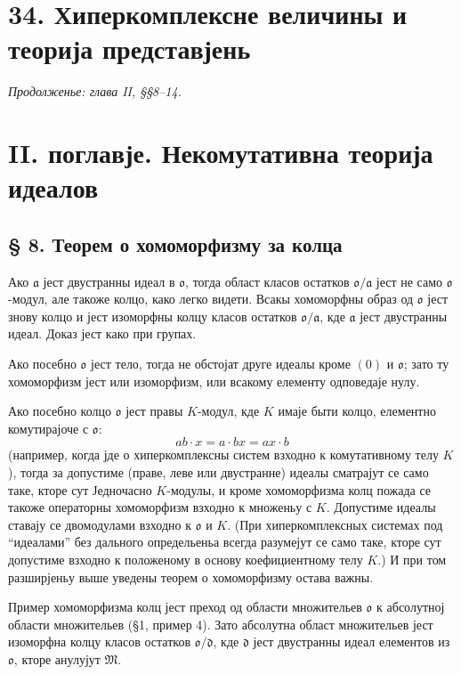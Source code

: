 ﻿\documentclass[11pt]{article}
\providecommand{\mM}{\mathfrak{M}}
\providecommand{\ma}{\mathfrak{a}}
\providecommand{\md}{\mathfrak{d}}
\providecommand{\mo}{\mathfrak{o}}
\begin{document}
\setcounter{footnote}{12}
\section*{34. Хиперкомплексне величины и теорија представјень}
\emph{Продолженье: глава II, §§8--14.}

\section*{II. поглавје. Некомутативна теорија идеалов}

\subsection*{§ 8. Теорем о хомоморфизму за колца}

Ако $\ma$ јест двустранны идеал в $\mo$, тогда област класов остатков $\mo/\ma$ јест не само $\mo$-модул, але такоже колцо, како легко видети. Всакы хомоморфны образ од $\mo$ јест знову колцо и јест изоморфны колцу класов остатков $\mo/\ma$, кде $\ma$ јест двустранны идеал. Доказ јест како при групах.

Ако посебно $\mo$ јест тело, тогда не обстојат друге идеалы кроме $(0)$ и $\mo$; зато ту хомоморфизм јест или изоморфизм, или всакому елементу одповедаје нулу.

Ако посебно колцо $\mo$ јест правы $K$-модул, кде $K$ имаје быти колцо, елементно комутирајоче с $\mo$:
\[
        ab\cdot x=a\cdot bx=ax\cdot b
\]
(например, когда јде о хиперкомплексны систем взходно к комутативному телу $K$), тогда за допустиме (праве, леве или двустранне) идеалы сматрајут се само таке, кторе сут Једночасно $K$-модулы, и кроме хомоморфизма колц пожада се такоже операторны хомоморфизм взходно к множеньу с $K$. Допустиме идеалы ставају се двомодулами взходно к $\mo$ и $K$. (При хиперкомплексных системах под ``идеалами'' без дального определьеньа всегда разумејут се само таке, кторе сут допустиме взходно к положеному в основу коефициентному телу $K$.) И при том разширјеньу выше уведены теорем о хомоморфизму остава важны.

Пример хомоморфизма колц јест преход од области множительев $\mo$ к абсолутној области множительев (§1, пример 4). Зато абсолутна област множительев јест изоморфна колцу класов остатков $\mo/\md$, кде $\md$ јест двустранны идеал елементов из $\mo$, кторе анулујут $\mM$.
\end{document}
